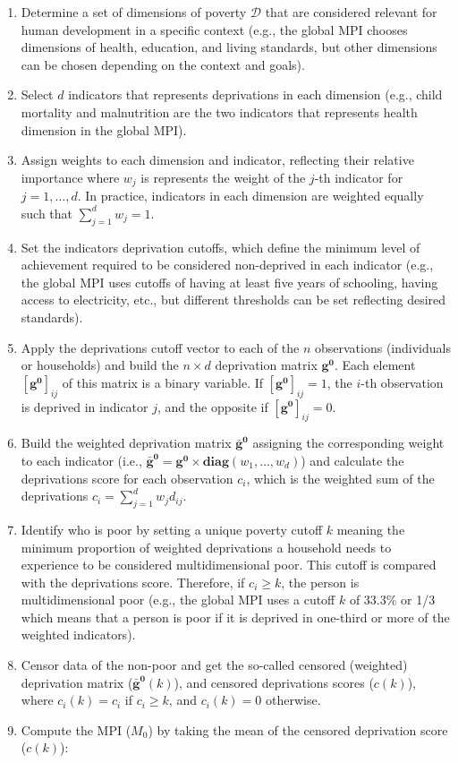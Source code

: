 \begin{enumerate}
\def\labelenumi{\arabic{enumi}.}
\item
  Determine a set of dimensions of poverty \(\mathcal{D}\) that are
  considered relevant for human development in a specific context
  (e.g., the global MPI chooses dimensions of health, education, and
  living standards, but other dimensions can be chosen depending on
  the context and goals).
\item
  Select \(d\) indicators that represents deprivations in each dimension
  (e.g., child mortality and malnutrition are the two indicators that
  represents health dimension in the global MPI).\\
\item
  Assign weights to each dimension and indicator, reflecting their
  relative importance where \(w_j\) is represents the weight of the
  \(j\)-th indicator for \(j = 1,\ldots,d\). In practice, indicators in
  each dimension are weighted equally such that
  \(\sum_{j=1}^d w_j = 1\).
\item
  Set the indicators deprivation cutoffs, which define the minimum
  level of achievement required to be considered non-deprived in each
  indicator (e.g., the global MPI uses cutoffs of having at least five
  years of schooling, having access to electricity, etc., but
  different thresholds can be set reflecting desired standards).
\item
  Apply the deprivations cutoff vector to each of the \(n\) observations
  (individuals or households) and build the \(n \times d\) deprivation
  matrix \(\mathbf{g^0}\). Each element
  \(\left[ \mathbf{g^0} \right]_{ij}\) of this matrix is a binary
  variable. If \(\left[ \mathbf{g^0} \right]_{ij} = 1\), the \(i\)-th
  observation is deprived in indicator \(j\), and the opposite if
  \(\left[ \mathbf{g^0} \right]_{ij} = 0\).
\item
  Build the weighted deprivation matrix \(\mathbf{\bar{g}^0}\) assigning
  the corresponding weight to each indicator (i.e.,
  \(\mathbf{\bar{g}^0} = \mathbf{g^0} \times \textbf{diag}(w_1,\ldots,w_d)\))
  and calculate the deprivations score for each observation \(c_i\),
  which is the weighted sum of the deprivations
  \(c_{i} = \sum_{j=1}^d w_j d_{ij}\).
\item
  Identify who is poor by setting a unique poverty cutoff \(k\) meaning
  the minimum proportion of weighted deprivations a household needs to
  experience to be considered multidimensional poor. This cutoff is
  compared with the deprivations score. Therefore, if \(c_{i} \geq k\),
  the person is multidimensional poor (e.g., the global MPI uses a
  cutoff \(k\) of 33.3\% or 1/3 which means that a person is poor if it
  is deprived in one-third or more of the weighted indicators).
\item
  Censor data of the non-poor and get the so-called censored
  (weighted) deprivation matrix (\(\mathbf{\bar{g}^0}(k)\)), and
  censored deprivations scores (\(c(k)\)), where \(c_{i} (k) = c_{i}\) if
  \(c_{i} \geq k\), and \(c_{i} (k) = 0\) otherwise.
\item
  Compute the MPI (\(M_0\)) by taking the mean of the censored
  deprivation score (\(c(k)\)):


\end{enumerate}
